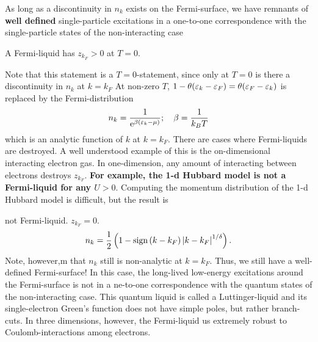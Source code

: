 As long as a discontinuity in $n_k$ exists on the Fermi-surface, we have remnants of \textbf{well defined} single-particle excitations in a one-to-one correspondence with the single-particle states of the non-interacting case
\begin{tcolorbox}
	A Fermi-liquid has $z_{k_F} > 0 $ at $T = 0$.
\end{tcolorbox} 
Note that this statement is a $T=0$-statement, since only at $T =0$ is there a discontinuity in $n_k$ at $k = k_F$
At non-zero $T$, $ 1-\theta(\varepsilon_k - \varepsilon_F) = \theta(\varepsilon_F-\varepsilon_k) $ is replaced by the Fermi-distribution
\begin{equation}
n_k = \frac{1}{\mathrm{e}^{\beta(\varepsilon_k-\mu)}} ; \quad \beta = \frac{1}{k_B T}
\end{equation}
which is an analytic function of $k$ at $k=k_F$.
There are cases where Fermi-liquids are destroyed. A well understood example of this is the on-dimensional interacting electron gas.
In one-dimension, any amount of interacting between electrons destroys $z_{k_F}$. \textbf{For example, the 1-d Hubbard model is not a Fermi-liquid for any $U>0$}. Computing the momentum distribution of the 1-d Hubbard model is difficult, but the result is 
\begin{center}
\end{center}
not Fermi-liquid. $z_{k_F} = 0$. 
\begin{equation}
n_k=\frac{1}{2}\left(1-\text{sign}\left(k-k_{F}\right)\left|k-k_{F}\right|^{1 / \delta}\right).
\end{equation}
Note, however,m that $n_k$ still is non-analytic at $k=k_F$. Thus, we still have a well-defined Fermi-surface!
In this case, the long-lived low-energy excitations around the Fermi-surface is not in a ne-to-one correspondence with the quantum states of the non-interacting case. This quantum liquid is called a Luttinger-liquid and its single-electron Green's function does not have simple poles, but rather branch-cuts. 
In three dimensions, however, the Fermi-liquid us extremely robust to Coulomb-interactions among electrons. 

